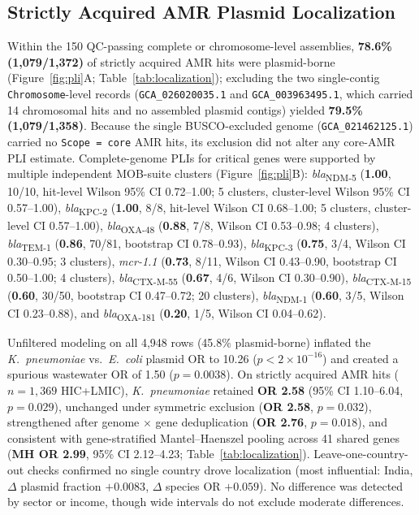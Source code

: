 \documentclass[11pt,a4paper]{article}
\begin{document}
\subsection{Strictly Acquired AMR Plasmid Localization}

Within the 150 QC-passing complete or chromosome-level assemblies, \textbf{78.6\% (1,079/1,372)} of strictly acquired AMR hits were plasmid-borne (Figure~\ref{fig:pli}A; Table~\ref{tab:localization}); excluding the two single-contig \texttt{Chromosome}-level records (\texttt{GCA\_026020035.1} and \texttt{GCA\_003963495.1}, which carried 14 chromosomal hits and no assembled plasmid contigs) yielded \textbf{79.5\% (1,079/1,358)}. Because the single BUSCO-excluded genome (\texttt{GCA\_021462125.1}) carried no \texttt{Scope = core} AMR hits, its exclusion did not alter any core-AMR PLI estimate. Complete-genome PLIs for critical genes were supported by multiple independent MOB-suite clusters (Figure~\ref{fig:pli}B): \textit{bla}\textsubscript{NDM-5} (\textbf{1.00}, 10/10, hit-level Wilson 95\% CI 0.72--1.00; 5 clusters, cluster-level Wilson 95\% CI 0.57--1.00), \textit{bla}\textsubscript{KPC-2} (\textbf{1.00}, 8/8, hit-level Wilson CI 0.68--1.00; 5 clusters, cluster-level CI 0.57--1.00), \textit{bla}\textsubscript{OXA-48} (\textbf{0.88}, 7/8, Wilson CI 0.53--0.98; 4 clusters), \textit{bla}\textsubscript{TEM-1} (\textbf{0.86}, 70/81, bootstrap CI 0.78--0.93), \textit{bla}\textsubscript{KPC-3} (\textbf{0.75}, 3/4, Wilson CI 0.30--0.95; 3 clusters), \textit{mcr-1.1} (\textbf{0.73}, 8/11, Wilson CI 0.43--0.90, bootstrap CI 0.50--1.00; 4 clusters), \textit{bla}\textsubscript{CTX-M-55} (\textbf{0.67}, 4/6, Wilson CI 0.30--0.90), \textit{bla}\textsubscript{CTX-M-15} (\textbf{0.60}, 30/50, bootstrap CI 0.47--0.72; 20 clusters), \textit{bla}\textsubscript{NDM-1} (\textbf{0.60}, 3/5, Wilson CI 0.23--0.88), and \textit{bla}\textsubscript{OXA-181} (\textbf{0.20}, 1/5, Wilson CI 0.04--0.62).

Unfiltered modeling on all 4,948 rows (45.8\% plasmid-borne) inflated the \textit{K.~pneumoniae} vs.\ \textit{E.~coli} plasmid OR to 10.26 ($p < 2 \times 10^{-16}$) and created a spurious wastewater OR of 1.50 ($p = 0.0038$). On strictly acquired AMR hits ($n = 1{,}369$ HIC+LMIC), \textit{K.~pneumoniae} retained \textbf{OR 2.58} (95\% CI 1.10--6.04, $p = 0.029$), unchanged under symmetric exclusion (\textbf{OR 2.58}, $p = 0.032$), strengthened after genome $\times$ gene deduplication (\textbf{OR 2.76}, $p = 0.018$), and consistent with gene-stratified Mantel--Haenszel pooling across 41 shared genes (\textbf{MH OR 2.99}, 95\% CI 2.12--4.23; Table~\ref{tab:localization}). Leave-one-country-out checks confirmed no single country drove localization (most influential: India, $\Delta$ plasmid fraction $+0.0083$, $\Delta$ species OR $+0.059$). No difference was detected by sector or income, though wide intervals do not exclude moderate differences.
\end{document}
